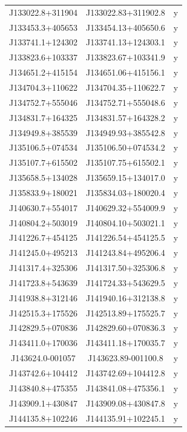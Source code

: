\begin{table}
\begin{tabular}{ccc}
        J133022.8+311904 & J133022.83+311902.8 & y\\
        J133453.3+405653 & J133454.13+405650.6 & y\\
        J133741.1+124302 & J133741.13+124303.1 & y\\
        J133823.6+103337 & J133823.67+103341.9 & y\\
        J134651.2+415154 & J134651.06+415156.1 & y\\
        J134704.3+110622 & J134704.35+110622.7 & y\\
        J134752.7+555046 & J134752.71+555048.6 & y\\
        J134831.7+164325 & J134831.57+164328.2 & y\\
        J134949.8+385539 & J134949.93+385542.8 & y\\
        J135106.5+074534 & J135106.50+074534.2 & y\\
        J135107.7+615502 & J135107.75+615502.1 & y\\
        J135658.5+134028 & J135659.15+134017.0 & y\\
        J135833.9+180021 & J135834.03+180020.4 & y\\
        J140630.7+554017 & J140629.32+554009.9 & y\\
        J140804.2+503019 & J140804.10+503021.1 & y\\
        J141226.7+454125 & J141226.54+454125.5 & y\\
        J141245.0+495213 & J141243.84+495206.4 & y\\
        J141317.4+325306 & J141317.50+325306.8 & y\\
        J141723.8+543639 & J141724.33+543629.5 & y\\
        J141938.8+312146 & J141940.16+312138.8 & y\\
        J142515.3+175526 & J142513.89+175525.7 & y\\
        J142829.5+070836 & J142829.60+070836.3 & y\\
        J143411.0+170036 & J143411.18+170035.7 & y\\
        J143624.0-001057 & J143623.89-001100.8 & y\\
        J143742.6+104412 & J143742.69+104412.8 & y\\
        J143840.8+475355 & J143841.08+475356.1 & y\\
        J143909.1+430847 & J143909.08+430847.8 & y\\
        J144135.8+102246 & J144135.91+102245.1 & y\\

\end{tabular}
\end{table}
